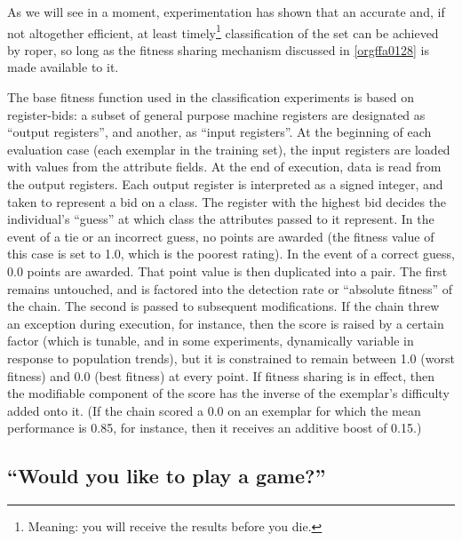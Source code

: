 \documentclass[12pt,glossary]{dalthesis}
\begin{document}
As we will see in a moment, experimentation has shown that an accurate and, if not
altogether efficient, at least timely\footnote{Meaning: you will receive the results before you die.} classification of the set can be achieved by
\gls{roper}, so long as the fitness sharing mechanism discussed in \ref{orgffa0128}
is made available to it. 

The base fitness function used in the classification experiments is based on
register-bids: a subset of general purpose machine registers are designated
as ``output registers'', and another, as ``input registers''. At the beginning of
each evaluation case (each exemplar in the training set), the input registers
are loaded with values from the attribute fields. At the end of execution,
data is read from the output registers. Each output register is interpreted
as a signed integer, and taken to represent a bid on a class. The register
with the highest bid decides the individual's ``guess'' at which class the
attributes passed to it represent. In the event of a tie or an incorrect
guess, no points are awarded (the fitness value of this case is set to 1.0,
which is the poorest rating). In the event of a correct guess, 0.0 points
are awarded. That point value is then duplicated into a pair. The first
remains untouched, and is factored into the detection rate or ``absolute
fitness'' of the chain. The second is passed to subsequent modifications.
If the chain threw an exception during execution, for instance, then the
score is raised by a certain factor (which is tunable, and in some experiments,
dynamically variable in response to population trends), but it is constrained
to remain between 1.0 (worst fitness) and 0.0 (best fitness) at every point.
If fitness sharing is in effect, then the modifiable component of the score
has the inverse of the exemplar's difficulty added onto it. (If the chain
scored a 0.0 on an exemplar for which the mean performance is 0.85, for instance,
then it receives an additive boost of 0.15.)



\subsection{``Would you like to play a game?''}
\label{sec:org65fb016}
\label{orgb6141c1}
\end{document}
